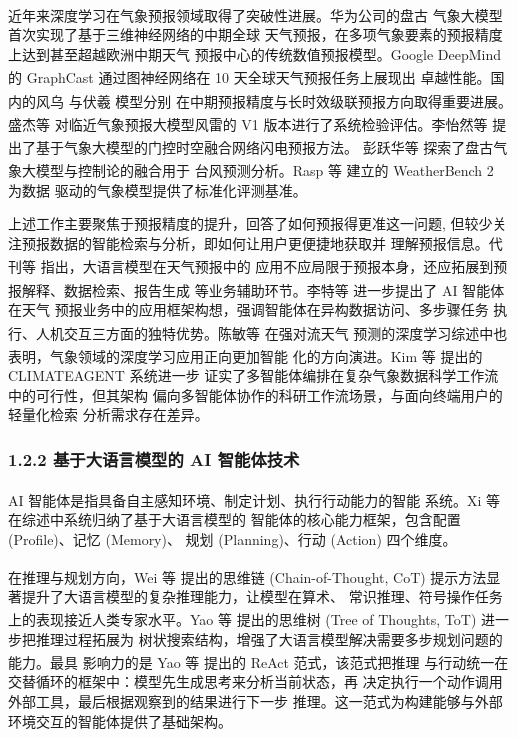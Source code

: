\documentclass[a4paper]{article}
\theoremstyle{definition}
\theoremstyle{plain}
\theoremstyle{remark}
\let\oldcite\cite
\renewcommand{\cite}[1]{\textsuperscript{\oldcite{#1}}}
\begin{document}
近年来深度学习在气象预报领域取得了突破性进展。华为公司的盘古
气象大模型 \cite{ref16} 首次实现了基于三维神经网络的中期全球
天气预报，在多项气象要素的预报精度上达到甚至超越欧洲中期天气
预报中心的传统数值预报模型。Google DeepMind 的 GraphCast
\cite{ref17} 通过图神经网络在 10 天全球天气预报任务上展现出
卓越性能。国内的风乌 \cite{ref26} 与伏羲 \cite{ref27} 模型分别
在中期预报精度与长时效级联预报方向取得重要进展。盛杰等 \cite{ref7}
对临近气象预报大模型风雷的 V1 版本进行了系统检验评估。李怡然等
\cite{ref6} 提出了基于气象大模型的门控时空融合网络闪电预报方法。
彭跃华等 \cite{ref8} 探索了盘古气象大模型与控制论的融合用于
台风预测分析。Rasp 等 \cite{ref25} 建立的 WeatherBench 2 为数据
驱动的气象模型提供了标准化评测基准。

上述工作主要聚焦于预报精度的提升，回答了如何预报得更准这一问题,
但较少关注预报数据的智能检索与分析，即如何让用户更便捷地获取并
理解预报信息。代刊等 \cite{ref5} 指出，大语言模型在天气预报中的
应用不应局限于预报本身，还应拓展到预报解释、数据检索、报告生成
等业务辅助环节。李特等 \cite{ref2} 进一步提出了 AI 智能体在天气
预报业务中的应用框架构想，强调智能体在异构数据访问、多步骤任务
执行、人机交互三方面的独特优势。陈敏等 \cite{ref9} 在强对流天气
预测的深度学习综述中也表明，气象领域的深度学习应用正向更加智能
化的方向演进。Kim 等 \cite{ref1} 提出的 CLIMATEAGENT 系统进一步
证实了多智能体编排在复杂气象数据科学工作流中的可行性，但其架构
偏向多智能体协作的科研工作流场景，与面向终端用户的轻量化检索
分析需求存在差异。

\subsubsection*{1.2.2 \quad 基于大语言模型的 AI 智能体技术}

AI 智能体是指具备自主感知环境、制定计划、执行行动能力的智能
系统。Xi 等 \cite{ref10} 在综述中系统归纳了基于大语言模型的
智能体的核心能力框架，包含配置 (Profile)、记忆 (Memory)、
规划 (Planning)、行动 (Action) 四个维度。

在推理与规划方向，Wei 等 \cite{ref13} 提出的思维链 (Chain-of-Thought,
CoT) 提示方法显著提升了大语言模型的复杂推理能力，让模型在算术、
常识推理、符号操作任务上的表现接近人类专家水平。Yao 等 \cite{ref30}
提出的思维树 (Tree of Thoughts, ToT) 进一步把推理过程拓展为
树状搜索结构，增强了大语言模型解决需要多步规划问题的能力。最具
影响力的是 Yao 等 \cite{ref18} 提出的 ReAct 范式，该范式把推理
与行动统一在交替循环的框架中：模型先生成思考来分析当前状态，再
决定执行一个动作调用外部工具，最后根据观察到的结果进行下一步
推理。这一范式为构建能够与外部环境交互的智能体提供了基础架构。
\end{document}
